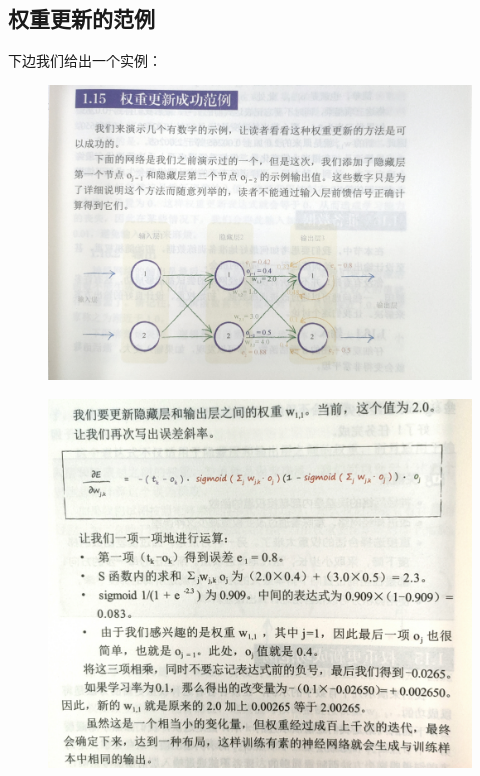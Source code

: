 \documentclass[12pt]{article}
\begin{document}
    \subsection{权重更新的范例}
    下边我们给出一个实例：
    \begin{figure}[!htb]
        \centering
        \includegraphics[scale=0.1]{picture/实例1.jpg}
    \end{figure}
    \begin{figure}[!htb]
        \centering
        \includegraphics[scale=0.12]{picture/实例2.jpg}
        \label{实例}
    \end{figure}
    
\end{document}
